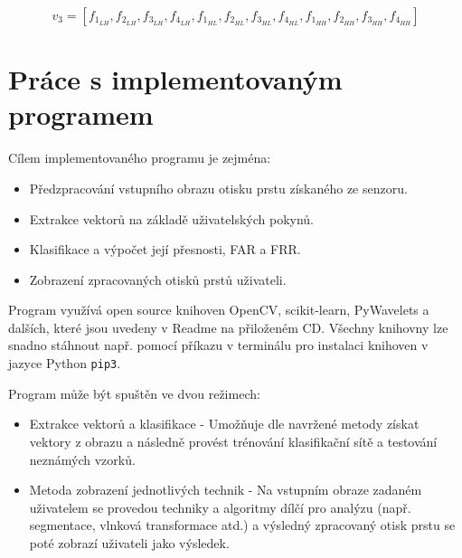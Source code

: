 $$v_3 = [f_{1_{LH}}, f_{2_{LH}}, f_{3_{LH}}, f_{4_{LH}}, f_{1_{HL}}, f_{2_{HL}}, f_{3_{HL}}, f_{4_{HL}}, f_{1_{HH}}, f_{2_{HH}}, f_{3_{HH}}, f_{4_{HH}}]$$

\section{Práce s implementovaným programem}
Cílem implementovaného programu je zejména:
\begin{itemize}
    \item Předzpracování vstupního obrazu otisku prstu získaného ze senzoru.
    \item Extrakce vektorů na základě uživatelských pokynů.
    \item Klasifikace a výpočet její přesnosti, FAR a FRR.
    \item Zobrazení zpracovaných otisků prstů uživateli.
\end{itemize}

Program využívá open source knihoven OpenCV, scikit-learn, PyWavelets a dalších, které jsou uvedeny v Readme na přiloženém CD. Všechny knihovny lze snadno stáhnout např. pomocí příkazu v terminálu pro instalaci knihoven v jazyce Python \verb|pip3|. 

Program může být spuštěn ve dvou režimech:
\begin{itemize}
    \item Extrakce vektorů a klasifikace - Umožňuje dle navržené metody získat vektory z obrazu a následně provést trénování klasifikační sítě a testování neznámých vzorků.
    \item Metoda zobrazení jednotlivých technik - Na vstupním obraze zadaném uživatelem se provedou techniky a algoritmy dílčí pro analýzu (např. segmentace, vlnková transformace atd.) a výsledný zpracovaný otisk prstu se poté zobrazí uživateli jako výsledek.
\end{itemize}

